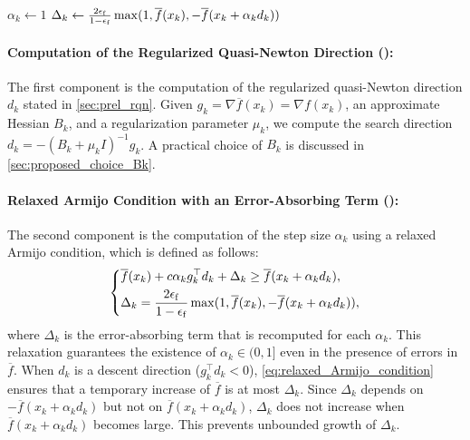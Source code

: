 \documentclass[journal]{subfiles}
\begin{document}
\DontPrintSemicolon
\begin{algorithm}[ht]
    \normalsize
    $\alpha_k \gets 1$\; \label{line:ls_init}
    $\Delta_k \gets \frac{2\epsilon_\mathrm{f}}{1-\epsilon_\mathrm{f}} \max(1, \overline{f}(x_k), -\overline{f}(x_k+\alpha_k d_k))$\;
    \;
    \caption{Backtracking Line Search with Relaxed Armijo Condition}
    \label{alg:backtracking_linesearch}
\end{algorithm}

\paragraph{Computation of the Regularized Quasi-Newton Direction (): }\label{sec:algorithm_components_d}

The first component is the computation of the regularized quasi-Newton direction $d_k$ stated in \cref{sec:prel_rqn}.
Given $g_k=\nabla \overline{f}(x_k) = \nabla f(x_k)$, an approximate Hessian $B_k$, and a regularization parameter $\mu_k$, we compute the search direction $d_k = -(B_k+\mu_k I)^{-1} g_k$.
A practical choice of $B_k$ is discussed in \cref{sec:proposed_choice_Bk}.

\paragraph{Relaxed Armijo Condition with an Error-Absorbing Term (): }\label{sec:algorithm_components_alpha}

The second component is the computation of the step size $\alpha_k$ using a relaxed Armijo condition, which is defined as follows:
\begin{equation}\label{eq:relaxed_Armijo_condition}
    \begin{dcases}
        \overline{f}(x_k)+c\alpha_k g_k^\top d_k+\Delta_k\ge\overline{f}(x_k+\alpha_k d_k), \\
        \Delta_k = \frac{2\epsilon_\mathrm{f}}{1-\epsilon_\mathrm{f}} \max(1, \overline{f}(x_k), -\overline{f}(x_k + \alpha_k d_k)),
    \end{dcases}
\end{equation}
where $\Delta_k$ is the error-absorbing term that is recomputed for each $\alpha_k$.
This relaxation guarantees the existence of $\alpha_k \in (0,1]$ even in the presence of errors in $\overline{f}$.
When $d_k$ is a descent direction ($g_k^\top d_k < 0$), \cref{eq:relaxed_Armijo_condition} ensures that a temporary increase of $\overline{f}$ is at most $\Delta_k$.
Since $\Delta_k$ depends on $-\overline{f}(x_k + \alpha_k d_k)$ but not on $\overline{f}(x_k + \alpha_k d_k)$, $\Delta_k$ does not increase when $\overline{f}(x_k + \alpha_k d_k)$ becomes large.
This prevents unbounded growth of $\Delta_k$.
\end{document}
